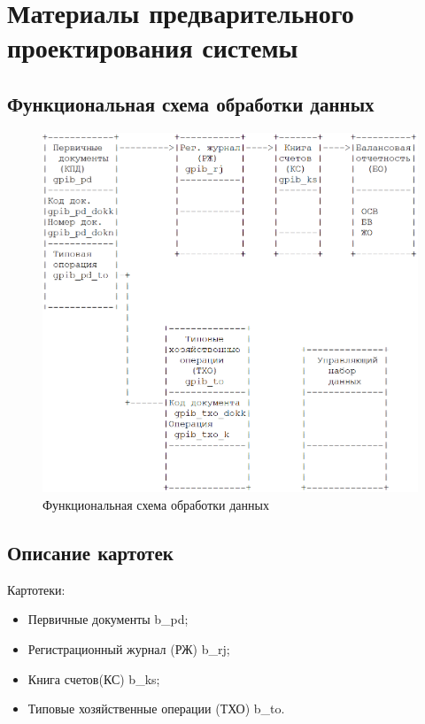 \section{Материалы предварительного проектирования системы}
\subsection{Функциональная схема обработки данных}

\begin{figure}[!htb]
    \centering
    \includegraphics[width=18cm]
        {_assets/gpib_part2.png}
    \caption{Функциональная схема обработки данных}
\end{figure}

\newpage

\subsection{Описание картотек}

Картотеки:

\begin{itemize}
    \item Первичные документы \gpiFIO\/b\_pd;
    \item Регистрационный журнал (РЖ) \gpiFIO\/b\_rj;
    \item Книга счетов(КС) \gpiFIO\/b\_ks;
    \item Типовые хозяйственные операции (ТХО) \gpiFIO\/b\_to.
\end{itemize}

